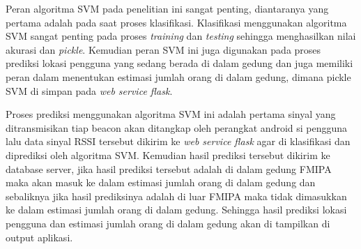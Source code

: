 \par Peran algoritma SVM pada penelitian ini sangat penting, diantaranya yang pertama adalah pada saat proses klasifikasi. Klasifikasi menggunakan algoritma SVM sangat penting pada proses \textit{training} dan \textit{testing} sehingga menghasilkan nilai akurasi dan \textit{pickle}. Kemudian peran SVM ini juga digunakan pada proses prediksi lokasi pengguna yang sedang berada di dalam gedung dan juga memiliki peran dalam menentukan estimasi jumlah orang di dalam gedung, dimana pickle SVM di simpan pada \textit{web service flask}.

\par Proses prediksi menggunakan algoritma SVM ini adalah pertama sinyal yang ditransmisikan tiap beacon akan ditangkap oleh perangkat android si pengguna lalu data sinyal RSSI tersebut dikirim ke \textit{web service flask} agar di klasifikasi dan diprediksi oleh algoritma SVM. Kemudian hasil prediksi tersebut dikirim ke database server, jika hasil prediksi tersebut adalah di dalam gedung FMIPA maka akan masuk ke dalam estimasi jumlah orang di dalam gedung dan sebaliknya jika hasil prediksinya adalah di luar FMIPA maka tidak dimasukkan ke dalam estimasi jumlah orang di dalam gedung. Sehingga hasil prediksi lokasi pengguna dan estimasi jumlah orang di dalam gedung akan di tampilkan di output aplikasi.



